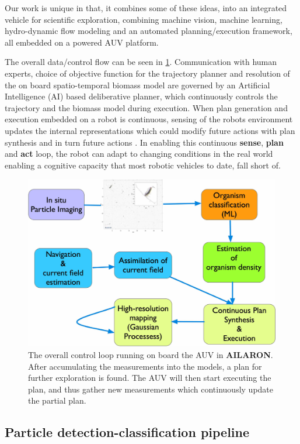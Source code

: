 \documentclass[conference]{IEEEtran}
\def\proje{{\textbf{AILARON}}}
\begin{document}
Our work is unique in that, it combines some of these ideas, into an
integrated vehicle for scientific exploration, combining machine
vision, machine learning, hydro-dynamic flow modeling and an automated
planning/execution framework, all embedded on a powered AUV platform.

The overall data/control flow can be seen in
\cref{fig:sensePlanActLoop}. Communication with human experts, choice
of objective function for the trajectory planner and resolution of the
on board spatio-temporal biomass model are governed by an Artificial
Intelligence (AI) based deliberative planner, which continuously
controls the trajectory and the biomass model during execution. When
plan generation and execution embedded on a robot is continuous,
sensing of the robots environment updates the internal representations
which could modify future actions with plan synthesis and in turn
future actions \cite{rajan12}.  In enabling this continuous
\textbf{sense}, \textbf{plan} and \textbf{act} loop, the robot can
adapt to changing conditions in the real world enabling a cognitive
capacity that most robotic vehicles to date, fall short of.

\begin{figure}[tbp]
\centerline{\includegraphics[width=0.8\linewidth]{figures/workflow-simplified.jpg}}
\caption{The overall control loop running on board the AUV in
  \proje. After accumulating the measurements into the models, a plan
  for further exploration is found. The AUV will then start executing
  the plan, and thus gather new measurements which continuously update
  the partial plan.}
\label{fig:sensePlanActLoop}
\end{figure}

\subsection{Particle detection-classification pipeline}
\end{document}
